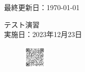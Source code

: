 \documentclass[a4paper,11pt]{jsarticle}
\begin{document}
\begin{titlepage}
  \hfill {最終更新日：\today}
  \begin{center}
    {\Huge\gt テスト演習}\\ \vspace{\baselineskip}
    \textup{\large 実施日：2023年12月23日}\\ 
  \end{center}
  \vfill
  \begin{figure}[H]
    \includegraphics[width=0.1\textwidth]{../images/qrcode.png}
  \end{figure}
\end{titlepage}

\qPart


\qPart


\qPart






\brankPage
\end{document}
